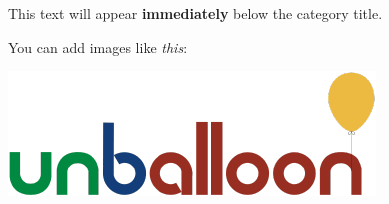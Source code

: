 This text will appear \textbf{immediately} below the category title.

You can add images like \textit{this}:

\begin{center}
    \includegraphics[scale=.5, keepaspectratio]{./theoretical/assets/unballoon.png}
\end{center}
